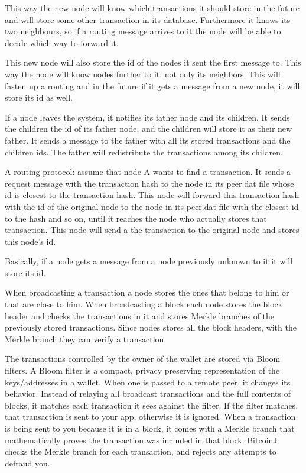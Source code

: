 \documentclass[a4paper,12pt]{article}
\begin{document}
This way the new node will know which transactions it should store in the future and will store some other transaction in its database. Furthermore it knows its two neighbours, so if a routing message arrives to it the node will be able to decide which way to forward it.

This new node will also store the id of the nodes it sent the first message to. This way the node will know nodes further to it, not only its neighbors. This will fasten up a routing and in the future if it gets a message from a new node, it will store its id as well.

If a node leaves the system, it notifies its father node and its children. It sends the children the id of its father node, and the children will store it as their new father. It sends a message to the father with all its stored transactions and the children ids. The father will redistribute the transactions among its children. 

A routing protocol: assume that node A wants to find a transaction. It sends a request message with the transaction hash to the node in its peer.dat file whose id is closest to the transaction hash. This node will forward this transaction hash with the id of the original node to the node in its peer.dat file with the closest id to the hash and so on, until it reaches the node who actually stores that transaction. This node will send a the transaction to the original node and stores this node's id.

Basically, if a node gets a message from a node previously unknown to it it will store its id.

When broadcasting a transaction a node stores the ones that belong to him or that are close to him. When broadcasting a block each node stores the block header and checks the transactions in it and stores Merkle branches of the previously stored transactions. Since nodes stores all the block headers, with the Merkle branch they can verify a transaction.

The transactions controlled by the owner of the wallet are stored via Bloom filters. A Bloom filter is a compact, privacy preserving representation of the keys/addresses in a wallet. When one is passed to a remote peer, it changes its behavior. Instead of relaying all broadcast transactions and the full contents of blocks, it matches each transaction it sees against the filter. If the filter matches, that transaction is sent to your app, otherwise it is ignored. When a transaction is being sent to you because it is in a block, it comes with a Merkle branch that mathematically proves the transaction was included in that block. BitcoinJ checks the Merkle branch for each transaction, and rejects any attempts to defraud you.
\end{document}
